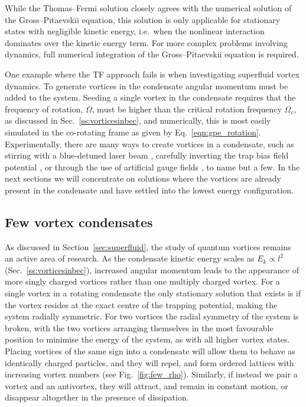 While the Thomas--Fermi solution closely agrees with the numerical solution of the Gross--Pitaevskii equation, this solution is only applicable for stationary states with negligible kinetic energy, i.e.~when the nonlinear interaction dominates over the kinetic energy term. For more complex problems involving dynamics, full numerical integration of the Gross--Pitaevskii equation is required.

One example where the TF approach fails is when investigating superfluid vortex dynamics. To generate vortices in the condensate angular momentum must be added to the system. Seeding a single vortex in the condensate requires that the frequency of rotation, $\Omega$, must be higher than the critical rotation frequency $\Omega_c$, as discussed in Sec.~\ref{ss:vorticesinbec}, and numerically, this is most easily simulated in the co-rotating frame as given by Eq.~\eqref{eqn:gpe_rotation}. Experimentally, there are many ways to create vortices in a condensate, such as stirring with a blue-detuned laser beam \cite{Vtx:Raman_prl_2001}, carefully inverting the trap bias field potential \cite{VTX:Kawaguchi_pra_2004_2,VTX:Masuda_pra_2016}, or through the use of artificial gauge fields \cite{AO:Dalibard_rmp_2011}, to name but a few. In the next sections we will concentrate on solutions where the vortices are already present in the condensate and have settled into the lowest energy configuration.


\subsection{Few vortex condensates}\label{sec:fewvtx}

As discussed in Section~\ref{sec:superfluid}, the study of quantum vortices remains an active area of research. As the condensate kinetic energy scales as $E_k \propto l^2$ (Sec.~\ref{ss:vorticesinbec}), increased angular momentum leads to the appearance of more singly charged vortices rather than one multiply charged vortex. For a single vortex in a rotating condensate the only stationary solution that exists is if the vortex resides at the exact centre of the trapping potential, making the system radially symmetric. For two vortices the radial symmetry of the system is broken, with the two vortices arranging themselves in the most favourable position to minimise the energy of the system, as with all higher vortex states. Placing vortices of the same sign into a condensate will allow them to behave as identically charged particles, and they will repel, and form ordered lattices with increasing vortex numbers (see Fig.~\ref{fig:few_rho}). Similarly, if instead we pair a vortex and an antivortex, they will attract, and remain in constant motion, or disappear altogether in the presence of dissipation.

